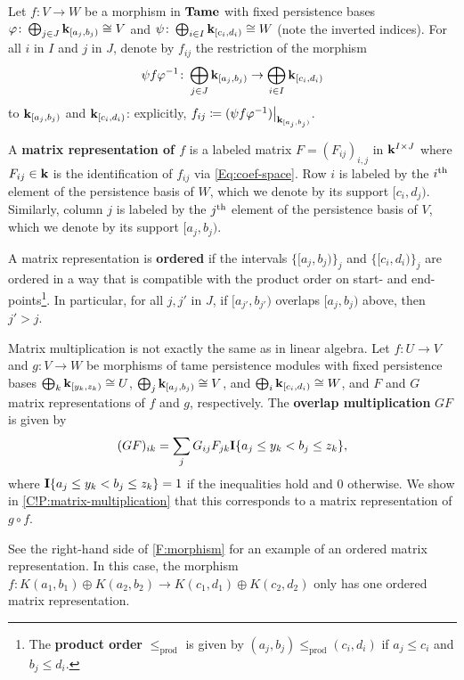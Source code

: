 \begin{definition}
  Let $f \colon V \to W$ be a morphism in $\Tame$ with fixed persistence bases $\varphi \colon \bigoplus_{j \in J} \K_{[a_j, b_j)} \cong V$ and $\psi \colon \bigoplus_{i \in I} \K_{[c_i, d_i)} \cong W$ (note the inverted indices). For all $i$ in $I$ and $j$ in $J$, denote by $f_{ij}$ the restriction of the morphism
  \[
    \psi f \varphi^{-1} \colon \bigoplus_{j \in J} \K_{[a_j, b_j)} \to \bigoplus_{i \in I} \K_{[c_i, d_i)}
  \]
  to $\K_{[a_j, b_j)}$ and $\K_{[c_i, d_i)}$: explicitly, $f_{ij} \coloneq (\psi f \varphi^{-1})\big|_{\K_{[a_j, b_j)}}$.
  
  A \textbf{matrix representation of $f$} is a labeled matrix $F = (F_{ij})_{i, j}$ in $\K^{I \times J}$ where $F_{ij} \in \K$ is the identification of $f_{ij}$ via \eqref{Eq:coef-space}. Row $i$ is labeled by the $i^{\th}$ element of the persistence basis of $W$, which we denote by its support $[c_i, d_j)$. Similarly, column $j$ is labeled by the $j^{\th}$ element of the persistence basis of $V$, which we denote by its support $[a_j, b_j)$.
  
  A matrix representation is \textbf{ordered} if the intervals $\{[a_j, b_j)\}_j$ and $\{[c_i, d_i)\}_j$ are ordered in a way that is compatible with the product order on start- and end-points\footnote{The \textbf{product order} $\leq_{\text{prod}}$ is given by $(a_j, b_j) \leq_{\text{prod}} (c_i, d_i)$ if $a_j \leq c_i$ and $b_j \leq d_i$.}. In particular, for all $j, j'$ in $J$, if $[a_{j'}, b_{j'})$ overlaps $[a_j, b_j)$ above, then $j' > j$.
  
  Matrix multiplication is not exactly the same as in linear algebra. Let $f \colon U \to V$ and $g \colon V \to W$ be morphisms of tame persistence modules with fixed persistence bases $\bigoplus_{k} \K_{[y_k, z_k)} \cong U$, $\bigoplus_{j} \K_{[a_j, b_j)} \cong V$, and $\bigoplus_{i} \K_{[c_i, d_i)} \cong W$, and $F$ and $G$ matrix representations of $f$ and $g$, respectively. The \textbf{overlap multiplication} $GF$ is given by
  \[
    (GF)_{ik} = \sum_{j} G_{ij} F_{jk} \bf{I}\{a_j \leq y_k < b_j \leq z_k\},
  \]
  where $\bf{I}\{a_j \leq y_k < b_j \leq z_k\} = 1$ if the inequalities hold and $0$ otherwise. We show in \cref{C!P:matrix-multiplication} that this corresponds to a matrix representation of $g \circ f$.
\end{definition}

\begin{example}
  See the right-hand side of \cref{F:morphism} for an example of an ordered matrix representation. In this case, the morphism $f \colon K(a_1,b_1) \oplus K(a_2,b_2) \rightarrow K(c_1,d_1) \oplus K(c_2,d_2)$ only has one ordered matrix representation.
\end{example}

